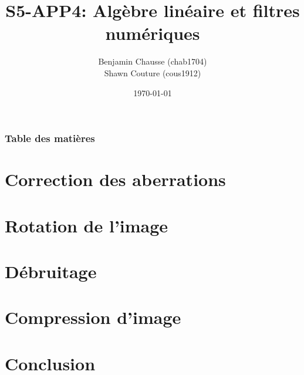 \documentclass[10pt]{beamer}
\title[Algèbre linéaire et filtres numériques]{S5-APP4: Algèbre linéaire et filtres numériques}
\author[Benjamin C. \& Shawn C.]{
  Benjamin Chausse (chab1704) \\
  Shawn Couture (cous1912)
}
\institute[UDS]{Université de Sherbrooke}
\date{\today}
\begin{document}
\maketitle

\begin{frame}
  \frametitle{Table des matières}
  \tableofcontents
\end{frame}

\section{Correction des aberrations}


\section{Rotation de l'image}


\section{Débruitage}




\section{Compression d'image}


\section{Conclusion}

\end{document}
